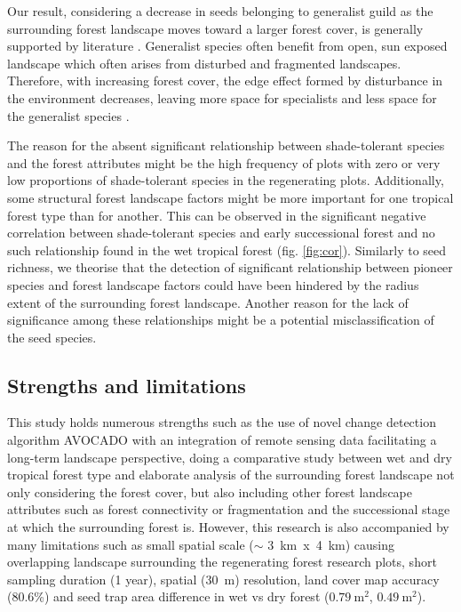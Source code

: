 Our result, considering a decrease in seeds belonging to generalist guild as the surrounding forest landscape moves toward a larger forest cover, is generally supported by literature \citep{santo-silvaNatureSeedlingAssemblages2013, poorterComprehensiveFrameworkVegetation2024}. Generalist species often benefit from open, sun exposed landscape which often arises from disturbed and fragmented landscapes. Therefore, with increasing forest cover, the edge effect formed by disturbance in the environment decreases, leaving more space for specialists and less space for the generalist species \citep{v.h.safarLandscapeOpennessHas2022a, santo-silvaNatureSeedlingAssemblages2013}.

The reason for the absent significant relationship between shade-tolerant species and the forest attributes might be the high frequency of plots with zero or very low proportions of shade-tolerant species in the regenerating plots. Additionally, some structural forest landscape factors might be more important for one tropical forest type than for another. This can be observed in the significant negative correlation between shade-tolerant species and early successional forest and no such relationship found in the wet tropical forest (fig. \ref{fig:cor}).  Similarly to seed richness, we theorise that the detection of significant relationship between pioneer species and forest landscape factors could have been hindered by the radius extent of the surrounding forest landscape.
Another reason for the lack of significance among these relationships might be a potential misclassification of the seed species. 

\subsection{Strengths and limitations}
This study holds numerous strengths such as the use of novel change detection algorithm \ac{AVOCADO} with an integration of remote sensing data facilitating a long-term landscape perspective, doing a comparative study between wet and dry tropical forest type and elaborate analysis of the surrounding forest landscape not only considering the forest cover, but also including other forest landscape attributes such as forest connectivity or fragmentation and the successional stage at which the surrounding forest is. However, this research is also accompanied by many limitations such as small spatial scale ($\sim$ 3~km\ x\ 4~km) causing overlapping  landscape surrounding the regenerating forest research plots, short sampling duration (1 year), spatial (30~m) resolution, land cover map accuracy (80.6\%) and seed trap area difference in wet vs dry forest ($0.79~\text{m}^2$, $0.49~\text{m}^2$).

